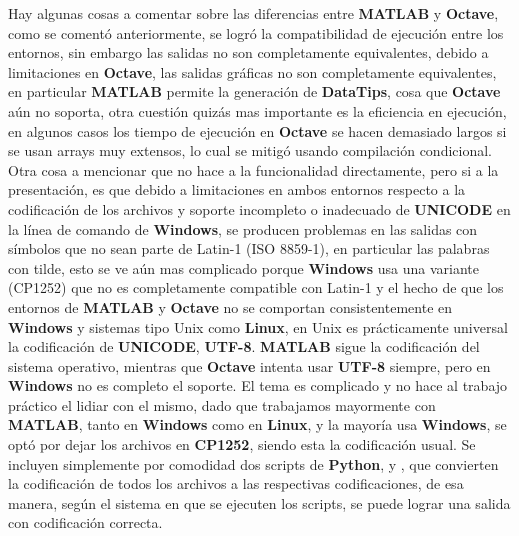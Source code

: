 Hay algunas cosas a comentar sobre las diferencias entre \textbf{MATLAB} y \textbf{Octave}, como se comentó anteriormente, se logró la compatibilidad de ejecución entre los entornos, sin embargo las salidas no son completamente equivalentes, debido a limitaciones en \textbf{Octave}, las salidas gráficas no son completamente equivalentes, en particular \textbf{MATLAB} permite la generación de \textbf{DataTips}, cosa que \textbf{Octave} aún no soporta, otra cuestión quizás mas importante es la eficiencia en ejecución, en algunos casos los tiempo de ejecución en \textbf{Octave} se hacen demasiado largos si se usan arrays muy extensos, lo cual se mitigó usando compilación condicional. Otra cosa a mencionar que no hace a la funcionalidad directamente, pero si a la presentación, es que debido a limitaciones en ambos entornos respecto a la codificación de los archivos y soporte incompleto o inadecuado de \textbf{UNICODE} en la línea de comando de \textbf{Windows}, se producen problemas en las salidas con símbolos que no sean parte de Latin-1 (ISO 8859-1), en particular las palabras con tilde, esto se ve aún mas complicado porque \textbf{Windows} usa una variante (CP1252) que no es completamente compatible con Latin-1 y el hecho de que los entornos de \textbf{MATLAB} y \textbf{Octave} no se comportan consistentemente en \textbf{Windows} y sistemas tipo Unix como \textbf{Linux}, en Unix es prácticamente universal la codificación de \textbf{UNICODE}, \textbf{UTF-8}. \textbf{MATLAB} sigue la codificación del sistema operativo, mientras que \textbf{Octave} intenta usar \textbf{UTF-8} siempre, pero en \textbf{Windows} no es completo el soporte. El tema es complicado y no hace al trabajo práctico el lidiar con el mismo, dado que trabajamos mayormente con \textbf{MATLAB}, tanto en \textbf{Windows} como en \textbf{Linux}, y la mayoría usa \textbf{Windows}, se optó por dejar los archivos en \textbf{CP1252}, siendo esta la codificación usual. Se incluyen simplemente por comodidad dos scripts de \textbf{Python}, \textbf{} y \textbf{}, que convierten la codificación de todos los archivos \textbf{} a las respectivas codificaciones, de esa manera, según el sistema en que se ejecuten los scripts,  se puede lograr una salida con codificación correcta.


\clearpage